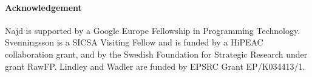 \documentclass[authoryear,9pt]{sigplanconf}
\begin{document}
\paragraph*{Acknowledgement}
Najd is supported by a Google Europe Fellowship in Programming
Technology.
Svenningsson is a SICSA Visiting Fellow and is funded by a HiPEAC
collaboration grant, and by the Swedish Foundation for Strategic
Research under grant RawFP.
Lindley and Wadler are funded by EPSRC Grant EP/K034413/1.



\end{document}
